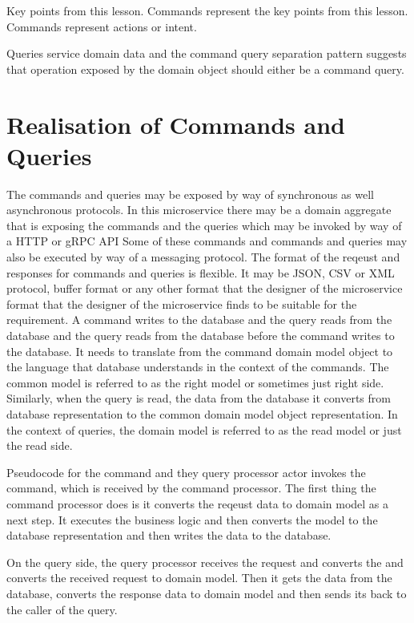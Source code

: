 Key points from this lesson.
Commands represent the key points from this lesson.
Commands represent actions or intent.

Queries service domain data and the command query separation pattern suggests that operation exposed by the domain object should either be a command query.

\section{Realisation of Commands and Queries}

The commands and queries may be exposed by way of synchronous as well asynchronous protocols.
In this microservice there may be a domain aggregate that is exposing the commands and the queries which may be invoked by way of a HTTP or gRPC API
Some of these commands and commands and queries may also be executed by way of a messaging protocol.
The format of the reqeust and responses for commands and queries is flexible.
It may be JSON, CSV or XML protocol, buffer format or any other format that the designer of the microservice format that the designer of the microservice finds to be suitable for the requirement.
A command writes to the database and the query reads from the database and the query reads from the database before the command writes to the database.
It needs to translate from the command domain model object to the language that database understands in the context of the commands.
The common model is referred to as the right model or sometimes just right side.
Similarly, when the query is read, the data from the database it converts from database representation to the common domain model object representation.
In the context of queries, the domain model is referred to as the read model or just the read side.

Pseudocode for the command and they query processor actor invokes the command, which is received by the command processor.
The first thing the command processor does is it converts the reqeust data to domain model as a next step.
It executes the business logic and then converts the model to the database representation and then writes the data to the database.

On the query side, the query processor receives the request and converts the and converts the received request to domain model.
Then it gets the data from the database, converts the response data to domain model and then sends its back to the caller of the query.

